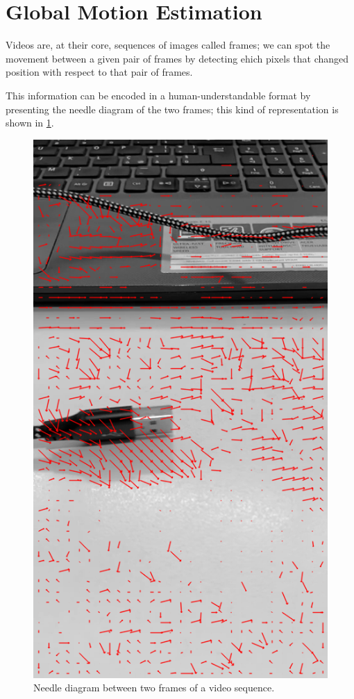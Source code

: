 \section{Global Motion Estimation}
\label{sec:02-gme}
Videos are, at their core, sequences of images called frames; we can spot the movement between a given pair of frames by detecting ehich pixels that changed position with respect to that pair of frames.


This information can be encoded in a human-understandable format by presenting the needle diagram of the two frames; this kind of representation is shown in \cref{fig:needle-diagram}.

\begin{figure}
    \centering
    \includegraphics[width=.7\linewidth]{../assets/images/bbme-0-res.png}
    \caption{Needle diagram between two frames of a video sequence.}
    \label{fig:needle-diagram}
\end{figure}

